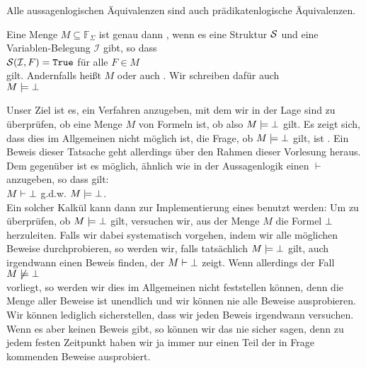 \remarks
Alle aussagenlogischen Äquivalenzen sind auch prädikatenlogische Äquivalenzen.
\eox

\begin{Definition}[Erfüllbar]
    Eine Menge $M \subseteq \mathbb{F}_\Sigma$ ist genau dann ,
    wenn es eine Struktur $\mathcal{S}$ und eine Variablen-Belegung $\mathcal{I}$ gibt, so dass 
    \\[0.2cm]
    \hspace*{1.3cm}
    $\mathcal{S}(\mathcal{I},F) = \mathtt{True}$ \quad für alle $F \in M$ 
    \\[0.2cm]
    gilt.  Andernfalls heißt $M$  oder auch . 
    Wir schreiben dafür auch \\[0.2cm]
    \hspace*{1.3cm} $M \models \bot$
    \eox
\end{Definition}

\noindent
Unser Ziel ist es, ein Verfahren anzugeben, mit dem wir in der Lage sind zu überprüfen,
ob eine Menge $M$ von Formeln  ist, ob also 
 $M \models \bot$ gilt.  Es zeigt sich, dass dies im Allgemeinen nicht
möglich ist, die Frage, ob $M \models \bot$ gilt, ist .  Ein Beweis
dieser Tatsache geht allerdings über den Rahmen dieser Vorlesung heraus.
Dem gegenüber ist es möglich, ähnlich wie in der Aussagenlogik
einen  $\vdash$ anzugeben, so dass gilt: \\[0.2cm]
\hspace*{1.3cm} $M \vdash \bot$ \quad g.d.w. \quad $M \models \bot$. \\[0.2cm]
Ein solcher Kalkül kann dann zur Implementierung eines
 benutzt werden:  Um zu überprüfen, ob
$M \models \bot$ gilt, versuchen wir, aus der Menge $M$ die Formel $\bot$
herzuleiten.  
Falls wir dabei systematisch vorgehen, indem wir alle möglichen Beweise durchprobieren,
so werden wir, falls tatsächlich $M \models \bot$ gilt, auch irgendwann einen Beweis
finden, der $M \vdash \bot$ zeigt.   Wenn allerdings der Fall \\[0.2cm]
\hspace*{1.3cm}  $M \not\models \bot$ \\[0.2cm]
vorliegt,  so werden wir dies im Allgemeinen nicht feststellen können, denn die Menge aller Beweise ist unendlich 
und wir können nie alle Beweise ausprobieren.  Wir können lediglich sicherstellen, dass
wir jeden Beweis irgendwann versuchen.  Wenn es aber keinen Beweis gibt, so können wir das
nie sicher sagen, denn zu jedem festen Zeitpunkt haben wir ja immer nur einen Teil der in
Frage kommenden Beweise ausprobiert.

